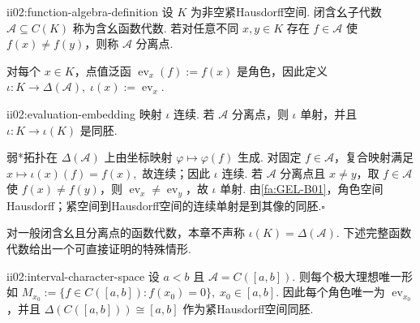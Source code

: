 \begin{FADefinition}[C][含幺函数代数]{ii02:function-algebra-definition}
设 \(\displaystyle K\) 为非空紧Hausdorff空间. 闭含幺子代数 \(\displaystyle\mathcal A\subseteq C(K)\) 称为含幺函数代数. 若对任意不同 \(\displaystyle x,y\in K\) 存在 \(\displaystyle f\in\mathcal A\) 使 \(\displaystyle f(x)\neq f(y)\)，则称 \(\displaystyle\mathcal A\) 分离点.
\end{FADefinition}

对每个 \(\displaystyle x\in K\)，点值泛函 \(\displaystyle\operatorname{ev}_x(f):=f(x)\) 是角色，因此定义
\(\displaystyle \iota:K\to\Delta(\mathcal A),\; \iota(x):=\operatorname{ev}_x.\)

\begin{FAProposition}[B][函数代数的点值嵌入]{ii02:evaluation-embedding}
映射 \(\displaystyle\iota\) 连续. 若 \(\displaystyle\mathcal A\) 分离点，则 \(\displaystyle\iota\) 单射，并且 \(\displaystyle\iota:K\to\iota(K)\) 是同胚.
\end{FAProposition}

\begin{FAProof}
弱*拓扑在 \(\displaystyle\Delta(\mathcal A)\) 上由坐标映射 \(\displaystyle\varphi\mapsto\varphi(f)\) 生成. 对固定 \(\displaystyle f\in\mathcal A\)，复合映射满足
\(\displaystyle x\longmapsto\iota(x)(f)=f(x),\)
故连续；因此 \(\displaystyle\iota\) 连续. 若 \(\displaystyle\mathcal A\) 分离点且 \(\displaystyle x\neq y\)，取 \(\displaystyle f\in\mathcal A\) 使 \(\displaystyle f(x)\neq f(y)\)，则 \(\displaystyle\operatorname{ev}_x\neq\operatorname{ev}_y\)，故 \(\displaystyle\iota\) 单射. 由\autoref{fa:GEL-B01}，角色空间Hausdorff；紧空间到Hausdorff空间的连续单射是到其像的同胚.\hfill\(\square\)
\end{FAProof}

对一般闭含幺且分离点的函数代数，本章不声称 \(\displaystyle\iota(K)=\Delta(\mathcal A)\). 下述完整函数代数给出一个可直接证明的特殊情形.

\begin{FATheorem}[B][区间连续函数代数的极大理想空间]{ii02:interval-character-space}
设 \(\displaystyle a<b\) 且 \(\displaystyle\mathcal A=C([a,b])\). 则每个极大理想唯一形如
\(\displaystyle M_{x_0}:=\{f\in C([a,b]):f(x_0)=0\}, \; x_0\in[a,b].\)
因此每个角色唯一为 \(\displaystyle\operatorname{ev}_{x_0}\)，并且
\(\displaystyle \Delta(C([a,b]))\cong[a,b]\)
作为紧Hausdorff空间同胚.
\end{FATheorem}

